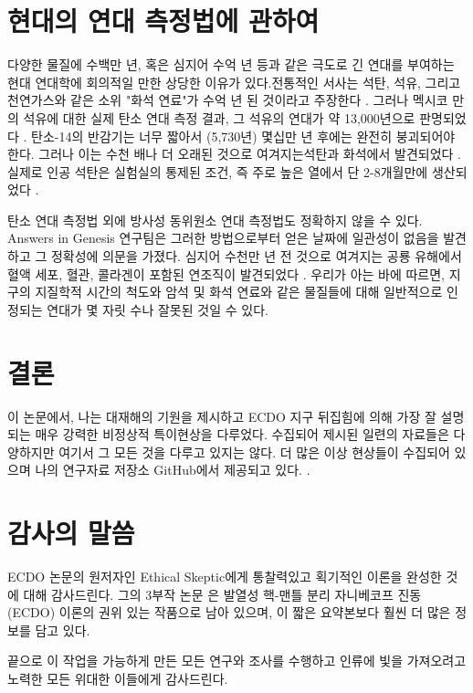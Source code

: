 \documentclass[10pt,twocolumn,letterpaper]{article}
\begin{document}
\section{현대의 연대 측정법에 관하여}

다양한 물질에  수백만 년, 혹은 심지어 수억 년 등과 같은 극도로 긴 연대를  부여하는 현대 연대학에 회의적일 만한 상당한 이유가 있다.전통적인 서사는 석탄, 석유, 그리고 천연가스와 같은 소위 "화석 연료"가 수억 년 된 것이라고 주장한다 \cite{104}. 그러나 멕시코 만의 석유에 대한 실제 탄소 연대 측정 결과, 그 석유의 연대가 약 13,000년으로 판명되었다 \cite{105}. 탄소-14의 반감기는 너무 짧아서 (5,730년) 몇십만 년 후에는 완전히 붕괴되어야 한다. 그러나 이는 수천 배나 더 오래된 것으로 여겨지는석탄과 화석에서 발견되었다 \cite{106}. 실제로 인공 석탄은 실험실의 통제된 조건, 즉 주로 높은 열에서 단 2-8개월만에 생산되었다 \cite{107}.

탄소 연대 측정법 외에  방사성 동위원소 연대 측정법도 정확하지 않을 수 있다. Answers in Genesis 연구팀은 그러한 방법으로부터 얻은 날짜에 일관성이 없음을 발견하고 그 정확성에 의문을 가졌다\cite{108}. 심지어 수천만 년 전 것으로 여겨지는 공룡 유해에서 혈액 세포, 혈관, 콜라겐이 포함된 연조직이 발견되었다 \cite{109,110}. 우리가 아는 바에 따르면, 지구의 지질학적 시간의 척도와 암석 및 화석 연료와 같은 물질들에 대해 일반적으로 인정되는 연대가 몇 자릿 수나 잘못된 것일 수 있다.

\section{결론}

이 논문에서, 나는 대재해의 기원을 제시하고 ECDO 지구 뒤집힘에 의해 가장 잘 설명되는 매우 강력한 비정상적 특이현상을 다루었다. 수집되어 제시된 일련의 자료들은 다양하지만 여기서 그 모든 것을 다루고 있지는 않다.  더 많은 이상 현상들이 수집되어 있으며 나의 연구자료 저장소 GitHub에서 제공되고 있다.  \cite{2}.

\section{감사의 말씀}

 ECDO 논문의 원저자인 Ethical Skeptic에게 통찰력있고 획기적인 이론을 완성한 것에 대해 감사드린다. 그의 3부작 논문 \cite{1}은 발열성 핵-맨틀 분리 자니베코프 진동 (ECDO) 이론의 권위 있는 작품으로 남아 있으며, 이 짧은 요약본보다 훨씬 더 많은 정보를 담고 있다.

끝으로 이 작업을 가능하게 만든 모든 연구와 조사를 수행하고 인류에 빛을 가져오려고 노력한 모든 위대한 이들에게 감사드린다.

\clearpage
\twocolumn

{\small


}
\end{document}
